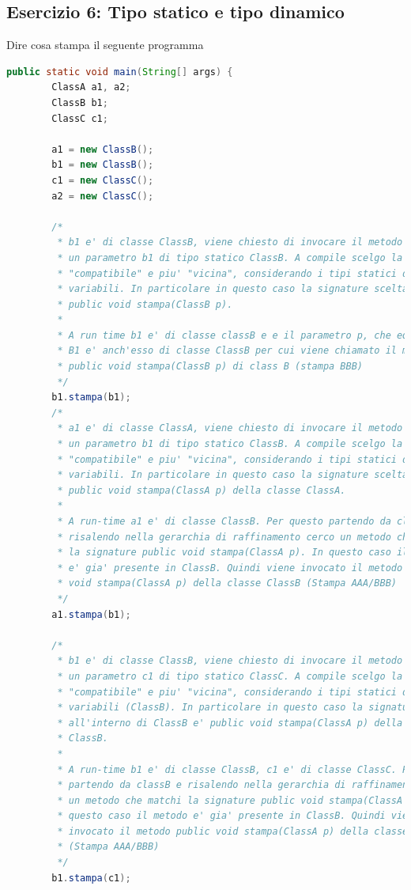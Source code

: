\documentclass{article}
\begin{document}
\subsection{Esercizio 6: Tipo statico e tipo dinamico}
Dire cosa stampa il seguente programma 
\begin{lstlisting}[language=Java,escapechar=|]
public static void main(String[] args) {
		ClassA a1, a2;
		ClassB b1;
		ClassC c1;

		a1 = new ClassB();
		b1 = new ClassB();
		c1 = new ClassC();
		a2 = new ClassC();

		/*
		 * b1 e' di classe ClassB, viene chiesto di invocare il metodo stampa su
		 * un parametro b1 di tipo statico ClassB. A compile scelgo la signature
		 * "compatibile" e piu' "vicina", considerando i tipi statici delle
		 * variabili. In particolare in questo caso la signature scelta e'
		 * public void stampa(ClassB p).
		 * 
		 * A run time b1 e' di classe classB e e il parametro p, che equivale a
		 * B1 e' anch'esso di classe ClassB per cui viene chiamato il metodo
		 * public void stampa(ClassB p) di class B (stampa BBB)
		 */
		b1.stampa(b1);
		/*
		 * a1 e' di classe ClassA, viene chiesto di invocare il metodo stampa su
		 * un parametro b1 di tipo statico ClassB. A compile scelgo la signature
		 * "compatibile" e piu' "vicina", considerando i tipi statici delle
		 * variabili. In particolare in questo caso la signature scelta e'
		 * public void stampa(ClassA p) della classe ClassA.
		 * 
		 * A run-time a1 e' di classe ClassB. Per questo partendo da classB e
		 * risalendo nella gerarchia di raffinamento cerco un metodo che matchi
		 * la signature public void stampa(ClassA p). In questo caso il metodo
		 * e' gia' presente in ClassB. Quindi viene invocato il metodo public
		 * void stampa(ClassA p) della classe ClassB (Stampa AAA/BBB)
		 */
		a1.stampa(b1);

		/*
		 * b1 e' di classe ClassB, viene chiesto di invocare il metodo stampa su
		 * un parametro c1 di tipo statico ClassC. A compile scelgo la signature
		 * "compatibile" e piu' "vicina", considerando i tipi statici delle
		 * variabili (ClassB). In particolare in questo caso la signature scelta
		 * all'interno di ClassB e' public void stampa(ClassA p) della classe
		 * ClassB.
		 * 
		 * A run-time b1 e' di classe ClassB, c1 e' di classe ClassC. Per questo
		 * partendo da classB e risalendo nella gerarchia di raffinamento cerco
		 * un metodo che matchi la signature public void stampa(ClassA p). In
		 * questo caso il metodo e' gia' presente in ClassB. Quindi viene
		 * invocato il metodo public void stampa(ClassA p) della classe ClassB
		 * (Stampa AAA/BBB)
		 */
		b1.stampa(c1);


\end{lstlisting}
\end{document}
